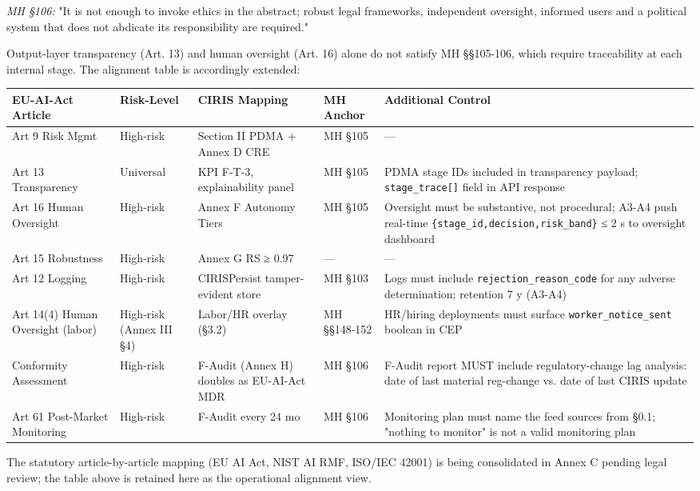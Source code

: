 \documentclass[11pt]{article}
\begin{document}
\textit{MH §106:} "It is not enough to invoke ethics in the abstract; robust legal frameworks, independent oversight, informed users and a political system that does not abdicate its responsibility are required."


Output-layer transparency (Art. 13) and human oversight (Art. 16) alone do not satisfy MH §§105-106, which require traceability at each internal stage. The alignment table is accordingly extended:


{\scriptsize
\begin{longtable}{|p{3.2cm}|p{3.2cm}|p{3.2cm}|p{3.2cm}|p{3.2cm}|}\hline
\textbf{EU-AI-Act Article} & \textbf{Risk-Level} & \textbf{CIRIS Mapping} & \textbf{MH Anchor} & \textbf{Additional Control} \\ \hline\endhead
Art 9 Risk Mgmt & High-risk & Section II PDMA + Annex D CRE & MH §105 & — \\ \hline
Art 13 Transparency & Universal & KPI F-T-3, explainability panel & MH §105 & PDMA stage IDs included in transparency payload; \texttt{stage\_trace[]} field in API response \\ \hline
Art 16 Human Oversight & High-risk & Annex F Autonomy Tiers & MH §105 & Oversight must be substantive, not procedural; A3-A4 push real-time \texttt{\{stage\_id,decision,risk\_band\}} ≤ 2 s to oversight dashboard \\ \hline
Art 15 Robustness & High-risk & Annex G RS ≥ 0.97 & — & — \\ \hline
Art 12 Logging & High-risk & CIRISPersist tamper-evident store & MH §103 & Logs must include \texttt{rejection\_reason\_code} for any adverse determination; retention 7 y (A3-A4) \\ \hline
Art 14(4) Human Oversight (labor) & High-risk (Annex III §4) & Labor/HR overlay (§3.2) & MH §§148-152 & HR/hiring deployments must surface \texttt{worker\_notice\_sent} boolean in CEP \\ \hline
Conformity Assessment & High-risk & F-Audit (Annex H) doubles as EU-AI-Act MDR & MH §106 & F-Audit report MUST include regulatory-change lag analysis: date of last material reg-change vs. date of last CIRIS update \\ \hline
Art 61 Post-Market Monitoring & High-risk & F-Audit every 24 mo & MH §106 & Monitoring plan must name the feed sources from §0.1; "nothing to monitor" is not a valid monitoring plan \\ \hline
\end{longtable}}


The statutory article-by-article mapping (EU AI Act, NIST AI RMF, ISO/IEC 42001) is being consolidated in Annex C pending legal review; the table above is retained here as the operational alignment view.
\end{document}
